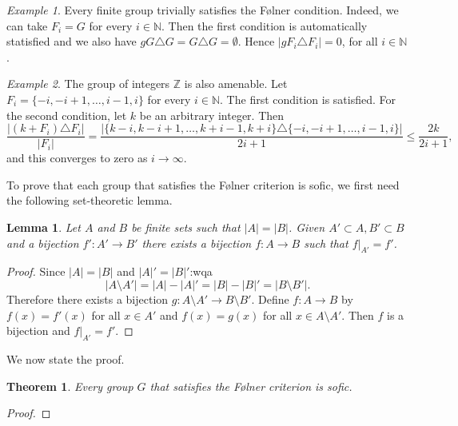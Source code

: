 \documentclass[titlepage, a4paper]{article}
\newcommand{\N}{\mathbb{N}}
\newcommand{\Z}{\mathbb{Z}}
\newcommand{\card}[1]{\left| #1 \right|}
\newtheorem{theorem}{Theorem}
\newtheorem{lemma}{Lemma}
\theoremstyle{remark}
\newtheorem{example}{Example}
\begin{document}
\begin{example}\label{ex:finite_group_folner}
    Every finite group trivially satisfies the Følner condition. Indeed, we can take $F_i = G$ for every $i \in \N$. Then the first condition is automatically statisfied and we also have $gG \triangle G = G \triangle G = \emptyset$. Hence $\card{gF_i\triangle F_i} = 0$, for all $i \in \N$.
\end{example}

\begin{example}\label{ex:integers_folner}
    The group of integers $\Z$ is also amenable. Let $F_i = \{-i, -i+1, \dots, i-1, i\}$ for every $i \in \N$. The first condition is satisfied. For the second condition, let $k$ be an arbitrary integer. Then
    \[
        \frac{\card{(k + F_i) \triangle F_i}}{\card{F_i}}
        = \frac{\card{\{k-i, k-i+1, \dots, k+i-1, k+i\}\triangle \{-i, -i+1, \dots, i-1, i\}}}{2i+1}
        \leq \frac{2k}{2i+1},
    \]
    and this converges to zero as $i \to \infty$.
\end{example}


To prove that each group that satisfies the Følner criterion is sofic, we first need the following set-theoretic lemma.

\begin{lemma}\label{lem:finite_bijections} 
        Let $A$ and $B$ be finite sets such that $|A| = |B|$. Given $A' \subset A, B' \subset B$ and a bijection $f': A' \to B'$ there exists a bijection $f: A \to B$ such that $f|_{A'} = f'$. 
    \end{lemma}
    \begin{proof}
        Since $\card A = \card B$ and $\card A' = \card B'$:wqa
        \[
        \card{A \setminus A'} = \card A - \card A' = \card B - \card B' = \card{B \setminus B'}.
        \]
        Therefore there exists a bijection $g: A \setminus A' \to B \setminus B'$. Define $f: A  \to B$ by $f(x) = f'(x)$ for all $x \in A'$ and $f(x)=g(x)$ for all $x \in A \setminus A'$. Then $f$ is a bijection and $f|_{A'} = f'$.
    \end{proof}

We now state the proof.

 	\begin{theorem}\label{thm:folner_sofic}
        Every group $G$ that satisfies the Følner criterion is sofic.
    \end{theorem}
    \begin{proof}
        
 	\end{proof}
\end{document}

